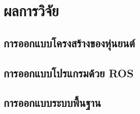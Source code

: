 \chapter{ผลการวิจัย}


\section{การออกแบบโครงสร้างของหุ่นยนต์}


\section{การออกแบบโปรแกรมด้วย ROS}


\section{การออกแบบระบบพื้นฐาน}
